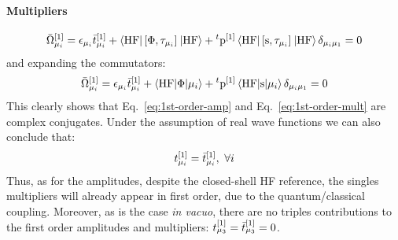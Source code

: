 \paragraph*{Multipliers}
\begin{equation}%
  \bar{\Omega}_{\mu_i}^{[1]} =
    \denom{\mu_i}\tbar{\mu_i}^{[1]}
    + \braket{\mathrm{HF} | \commutator{\Phi}{\cluster{\mu_i}} | \mathrm{HF}}
    + {}^t\p^{[1]}\braket{\mathrm{HF} |
    \commutator{\s}{\cluster{\mu_i}} | \mathrm{HF}}\delta_{\mu_i\mu_1} =0
\end{equation}
and expanding the commutators:
\begin{equation}\label{eq:1st-order-mult}
  \bar{\Omega}_{\mu_i}^{[1]} =
    \epsilon_{\mu_i}\bar{t}_{\mu_i}^{[1]}
    + \braket{\mathrm{HF} | \Phi | \mu_i}
    + {}^t\mathrm{p}^{[1]}\braket{\mathrm{HF} | \mathrm{s} | \mu_i}\delta_{\mu_i\mu_1} =0
\end{equation}
This clearly shows that Eq.~\eqref{eq:1st-order-amp}
and Eq.~\eqref{eq:1st-order-mult} are complex conjugates. Under the
assumption of real wave functions we can also conclude that:
\begin{equation}
  t_{\mu_i}^{[1]} = \bar{t}_{\mu_i}^{[1]},\,\,\forall i
\end{equation}
Thus, as for the amplitudes, despite the closed-shell \acs{HF} reference, the singles
multipliers will already appear in first order, due to the
quantum/classical coupling.
Moreover, as is the case \emph{in vacuo}, there are no triples contributions to
the first order amplitudes and multipliers: $t_{\mu_3}^{[1]} = \bar{t}_{\mu_3}^{[1]} = 0$.


